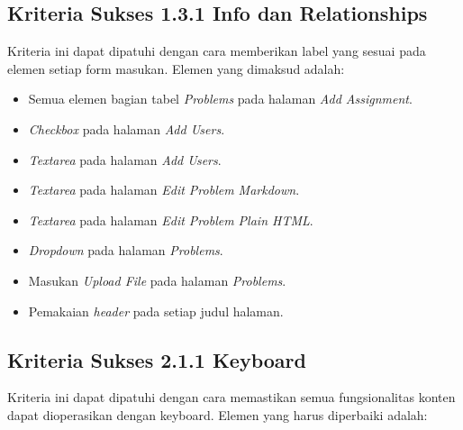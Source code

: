 \subsection{Kriteria Sukses 1.3.1 Info dan Relationships}
\label{subsec:peningkatan_A_1.3.1}

Kriteria ini dapat dipatuhi dengan cara memberikan label yang sesuai pada elemen setiap form masukan. Elemen yang dimaksud adalah:

\begin{itemize}
	\item Semua elemen bagian tabel \textit{Problems} pada halaman \textit{Add Assignment}.
	\item \textit{Checkbox} pada halaman \textit{Add Users}.
	\item \textit{Textarea} pada halaman \textit{Add Users}.
	\item \textit{Textarea} pada halaman \textit{Edit Problem Markdown}.
	\item \textit{Textarea} pada halaman \textit{Edit Problem Plain HTML}.
	\item \textit{Dropdown} pada halaman \textit{Problems}.
	\item Masukan \textit{Upload File} pada halaman \textit{Problems}.
	\item Pemakaian \textit{header} pada setiap judul halaman.
\end{itemize}

\subsection{Kriteria Sukses 2.1.1 Keyboard}
\label{subsec:peningkatan_A_2.1.1}

Kriteria ini dapat dipatuhi dengan cara memastikan semua fungsionalitas konten dapat dioperasikan dengan keyboard. Elemen yang harus diperbaiki adalah:

